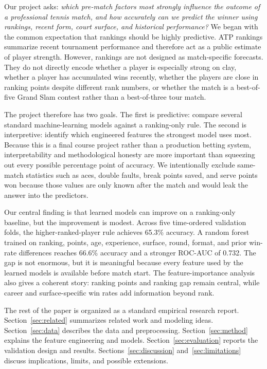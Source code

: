 \documentclass{article}
\begin{document}
Our project asks: \emph{which pre-match factors most strongly influence the outcome of a professional tennis match, and how accurately can we predict the winner using rankings, recent form, court surface, and historical performance?} We began with the common expectation that rankings should be highly predictive. ATP rankings summarize recent tournament performance and therefore act as a public estimate of player strength. However, rankings are not designed as match-specific forecasts. They do not directly encode whether a player is especially strong on clay, whether a player has accumulated wins recently, whether the players are close in ranking points despite different rank numbers, or whether the match is a best-of-five Grand Slam contest rather than a best-of-three tour match.

The project therefore has two goals. The first is predictive: compare several standard machine-learning models against a ranking-only rule. The second is interpretive: identify which engineered features the strongest model uses most. Because this is a final course project rather than a production betting system, interpretability and methodological honesty are more important than squeezing out every possible percentage point of accuracy. We intentionally exclude same-match statistics such as aces, double faults, break points saved, and serve points won because those values are only known after the match and would leak the answer into the predictors.

Our central finding is that learned models can improve on a ranking-only baseline, but the improvement is modest. Across five time-ordered validation folds, the higher-ranked-player rule achieves 65.3\% accuracy. A random forest trained on ranking, points, age, experience, surface, round, format, and prior win-rate differences reaches 66.6\% accuracy and a stronger ROC-AUC of 0.732. The gap is not enormous, but it is meaningful because every feature used by the learned models is available before match start. The feature-importance analysis also gives a coherent story: ranking points and ranking gap remain central, while career and surface-specific win rates add information beyond rank.

The rest of the paper is organized as a standard empirical research report. Section~\ref{sec:related} summarizes related work and modeling ideas. Section~\ref{sec:data} describes the data and preprocessing. Section~\ref{sec:method} explains the feature engineering and models. Section~\ref{sec:evaluation} reports the validation design and results. Sections~\ref{sec:discussion} and~\ref{sec:limitations} discuss implications, limits, and possible extensions.
\end{document}
